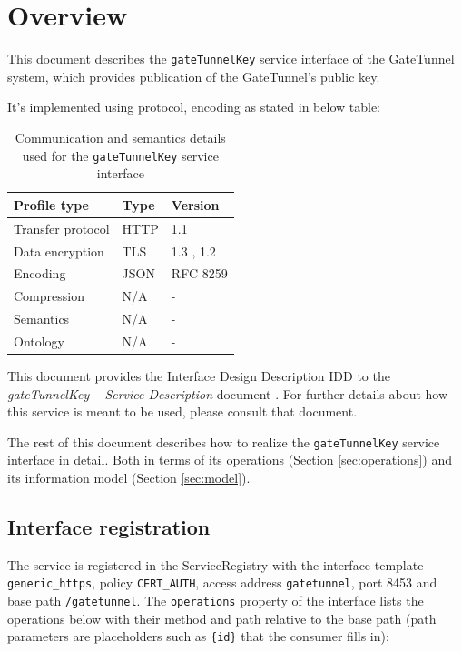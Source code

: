 \documentclass[a4paper]{arrowhead}
\begin{document}
\section{Overview}
\label{sec:overview}

This document describes the \texttt{gateTunnelKey} service interface of the GateTunnel system, which provides publication of the GateTunnel's public key.

It's implemented using protocol, encoding as stated in below table:
\begin{table}[ht!]
  \centering
  \begin{tabular}{|l|l|l|}
    \hline
    \rowcolor{gray!33} Profile type & Type & Version \\ \hline
    Transfer protocol & HTTP & 1.1 \cite{rfc9112} \\ \hline
    Data encryption & TLS & 1.3 \cite{rfc8446}, 1.2 \cite{rfc5246} \\ \hline
    Encoding & JSON & RFC 8259 \cite{rfc8259} \\ \hline
    Compression & N/A & - \\ \hline
    Semantics & N/A & - \\ \hline
    Ontology & N/A & - \\ \hline
  \end{tabular}
  \caption{Communication and semantics details used for the \texttt{gateTunnelKey} service interface}
  \label{tab:comunication_semantics_profile}
\end{table}

This document provides the Interface Design Description IDD to the \textit{gateTunnelKey -- Service Description} document \cite{gt-gateTunnelKey-sd}.
For further details about how this service is meant to be used, please consult that document.

The rest of this document describes how to realize the \texttt{gateTunnelKey} service
interface in detail. Both in terms of its operations (Section \ref{sec:operations}) and its information model (Section \ref{sec:model}).

\subsection{Interface registration}

The service is registered in the ServiceRegistry with the interface template \texttt{generic\_\allowbreak{}https}, policy \texttt{CERT\_\allowbreak{}AUTH}, access address \texttt{gatetunnel}, port 8453 and base path \texttt{/\allowbreak{}gatetunnel}. The \texttt{operations} property of the interface lists the operations below with their method and path relative to the base path (path parameters are placeholders such as \texttt{\{id\}} that the consumer fills in):
\end{document}
